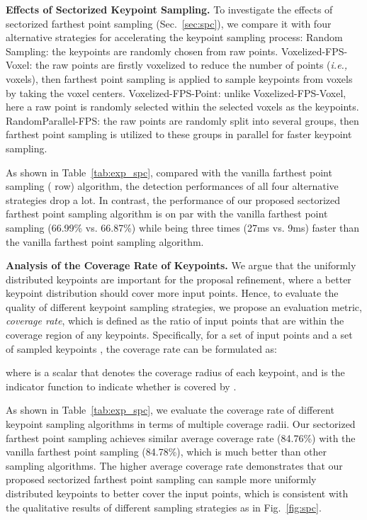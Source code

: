 \documentclass[natbib,twocolumn]{svjour3}          \smartqed  \usepackage{graphicx}
\begin{document}
\noindent
\textbf{Effects of Sectorized Keypoint Sampling.} 
To investigate the effects of sectorized farthest point sampling (Sec.~\ref{sec:spc}), 
we compare it with four alternative strategies for accelerating the keypoint sampling process: 
 Random Sampling: the keypoints are randomly chosen from raw points. 
 Voxelized-FPS-Voxel: the raw points are firstly voxelized to reduce the number of points (\emph{i.e.,} voxels), then farthest point sampling is applied to sample keypoints from voxels by taking the voxel centers. 
 Voxelized-FPS-Point: unlike Voxelized-FPS-Voxel, here a raw point is randomly selected within the selected voxels as the keypoints.  
 RandomParallel-FPS: the raw points are randomly split into several groups, then farthest point sampling is utilized to these groups in parallel for faster keypoint sampling. 


As shown in Table~\ref{tab:exp_spc}, compared with the vanilla farthest point sampling ( row) algorithm, the detection performances of all four alternative strategies drop a lot. In contrast, the performance of our proposed sectorized farthest point sampling algorithm is on par with the vanilla farthest point sampling (66.99\% vs. 66.87\%) while being three times (27ms vs. 9ms) faster than the vanilla farthest point sampling algorithm. 


\noindent
\textbf{Analysis of the Coverage Rate of Keypoints.}
We argue that the uniformly distributed keypoints are important for the proposal refinement, where a better keypoint distribution should cover more input points. 
Hence, to evaluate the quality of different keypoint sampling strategies,
 we propose an evaluation metric, \textit{coverage rate}, 
which is defined as the ratio of input points that are within the coverage region of any keypoints. 
Specifically, for a set of input points  and a set of sampled keypoints , the coverage rate  can be formulated as: 

where  is a scalar that denotes the coverage radius of each keypoint, 
and  is the indicator function to indicate whether  is covered by .


As shown in Table~\ref{tab:exp_spc}, we evaluate the coverage rate of different keypoint sampling algorithms in terms of multiple coverage radii. Our sectorized farthest point sampling achieves similar average coverage rate (84.76\%) with the vanilla farthest point sampling (84.78\%), which is much better than other sampling algorithms.
The higher average coverage rate demonstrates that our proposed sectorized farthest point sampling can sample more uniformly distributed keypoints to better cover the input points, which is consistent with the qualitative results of different sampling strategies as in Fig.~\ref{fig:spc}. 
\end{document}
